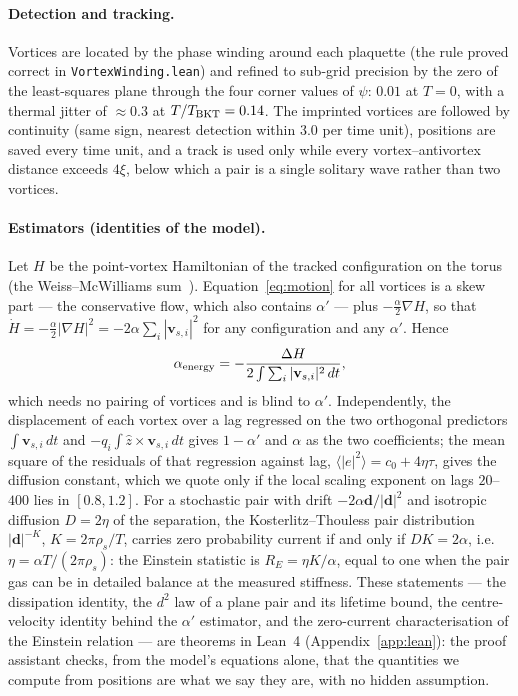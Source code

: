 \documentclass[11pt,a4paper]{article}
\newcommand{\lean}[1]{\texttt{\small #1}}
\begin{document}
\paragraph{Detection and tracking.} Vortices are located by the phase winding around each plaquette (the rule
proved correct in \lean{VortexWinding.lean}) and refined to sub-grid precision by the zero of the least-squares
plane through the four corner values of $\psi$: $0.01$ at $T=0$, with a thermal jitter of $\approx0.3$ at
$T/T_{\rm BKT}=0.14$. The imprinted vortices are followed by continuity (same sign, nearest detection within $3.0$
per time unit), positions are saved every time unit, and a track is used only while every vortex--antivortex
distance exceeds $4\xi$, below which a pair is a single solitary wave rather than two vortices.

\paragraph{Estimators (identities of the model).}\label{sec:estimators} Let $H$ be the point-vortex Hamiltonian of the
tracked configuration on the torus (the Weiss--McWilliams sum~\cite{WeissMcWilliams1991}). Equation~\eqref{eq:motion}
for all vortices is a skew part --- the conservative flow, which also contains $\alpha'$ --- plus
$-\tfrac{\alpha}{2}\nabla H$, so that $\dot H=-\tfrac{\alpha}{2}|\nabla H|^2=-2\alpha\sum_i|\mathbf v_{s,i}|^2$ for
any configuration and any $\alpha'$. Hence
\begin{equation}
  \alpha_{\rm energy}=-\frac{\Delta H}{2\int\sum_i|\mathbf v_{s,i}|^2\,dt},
  \label{eq:energy}
\end{equation}
which needs no pairing of vortices and is blind to $\alpha'$. Independently, the displacement of each vortex over a
lag regressed on the two orthogonal predictors $\int\mathbf v_{s,i}\,dt$ and $-q_i\!\int\hat z\times\mathbf v_{s,i}\,dt$
gives $1-\alpha'$ and $\alpha$ as the two coefficients; the mean square of the residuals of that regression against
lag, $\langle|e|^2\rangle=c_0+4\eta\tau$, gives the diffusion constant, which we quote only if the local scaling
exponent on lags $20$--$400$ lies in $[0.8,1.2]$. For a stochastic pair with drift $-2\alpha\mathbf d/|\mathbf d|^2$
and isotropic diffusion $D=2\eta$ of the separation, the Kosterlitz--Thouless pair distribution $|\mathbf d|^{-K}$,
$K=2\pi\rho_s/T$, carries zero probability current if and only if $DK=2\alpha$, i.e.\ $\eta=\alpha T/(2\pi\rho_s)$:
the Einstein statistic is $R_E=\eta K/\alpha$, equal to one when the pair gas can be in detailed balance at the
measured stiffness. These statements --- the dissipation identity, the $d^2$ law of a plane pair and its lifetime
bound, the centre-velocity identity behind the $\alpha'$ estimator, and the zero-current characterisation of the
Einstein relation --- are theorems in Lean~4 (Appendix~\ref{app:lean}): the proof assistant checks, from the model's
equations alone, that the quantities we compute from positions are what we say they are, with no hidden assumption.
\end{document}
